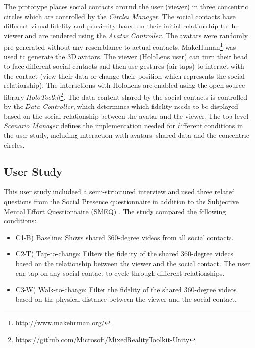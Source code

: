 The prototype places social contacts around the user (viewer) in three concentric circles which are controlled by the \textit{Circles Manager}. The social contacts have different visual fidelity and proximity based on their initial relationship to the viewer and are rendered using the \textit{Avatar Controller}. The avatars were randomly pre-generated without any resemblance to actual contacts. MakeHuman\footnote{http://www.makehuman.org/} was used to generate the 3D avatars. The viewer (HoloLens user) can turn their head to face different social contacts and then use gestures (air taps) to interact with the contact (view their data or change their position which represents the social relationship). The interactions with HoloLens are enabled using the open-source library \textit{HoloToolkit}\footnote{https://github.com/Microsoft/MixedRealityToolkit-Unity}. The data content shared by the social contacts is controlled by the \textit{Data Controller}, which determines which fidelity needs to be displayed based on the social relationship between the avatar and the viewer. The top-level \textit{Scenario Manager} defines the implementation needed for different conditions in the user study, including interaction with avatars, shared data and the concentric circles. 

\subsection{User Study}
This user study includeed a semi-structured interview and used three related questions from the Social Presence questionnaire in addition to the Subjective Mental Effort Questionnaire (SMEQ) \cite{Sauro2009}. The study compared the following conditions: 

\begin{itemize}
    \item C1-B) Baseline: Shows shared 360-degree videos from all social contacts.
    \item C2-T) Tap-to-change: Filters the fidelity of the shared 360-degree videos based on the relationship between the viewer and the social contact. The user can tap on any social contact to cycle through different relationships.
    \item C3-W) Walk-to-change: Filter the fidelity of the shared 360-degree videos based on the physical distance between the viewer and the social contact.
\end{itemize}

